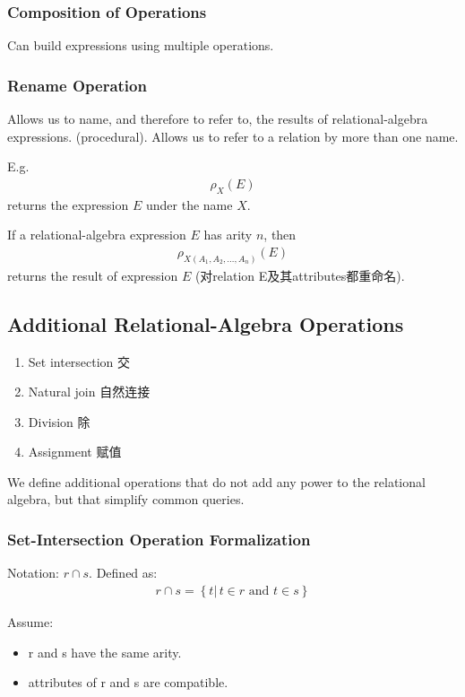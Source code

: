 \subsubsection{Composition of Operations}
Can build expressions using multiple operations.

\subsubsection{Rename Operation}
Allows us to name, and therefore to refer to, the results of relational-algebra expressions. (procedural). Allows us to refer to a relation by more than one name.

E.g. 
\begin{align*}
    \rho_X (E)
\end{align*}
returns the expression $E$ under the name $X$. 

If a relational-algebra expression $E$ has arity $n$, then
\begin{align*}
    \rho_{X(A_1,A_2,\dots,A_n)} (E)
\end{align*}
returns the result of expression $E$ (对relation E及其attributes都重命名). 

\subsection{Additional Relational-Algebra Operations}
\begin{enumerate}
    \item Set intersection 交
    \item Natural join 自然连接
    \item Division 除
    \item Assignment 赋值
\end{enumerate}
We define additional operations that do not add any power to the relational algebra, but that simplify common queries.

\subsubsection{Set-Intersection Operation Formalization}
Notation: $r\cap s$. Defined as: 
\begin{align*}
    r \cap s=\left\{ t | \, t \in r\text{ and }t \in s  \right\}
\end{align*}

Assume: 
\begin{itemize}
    \item r and s have the same arity.
    \item attributes of r and s are compatible. 
\end{itemize}

